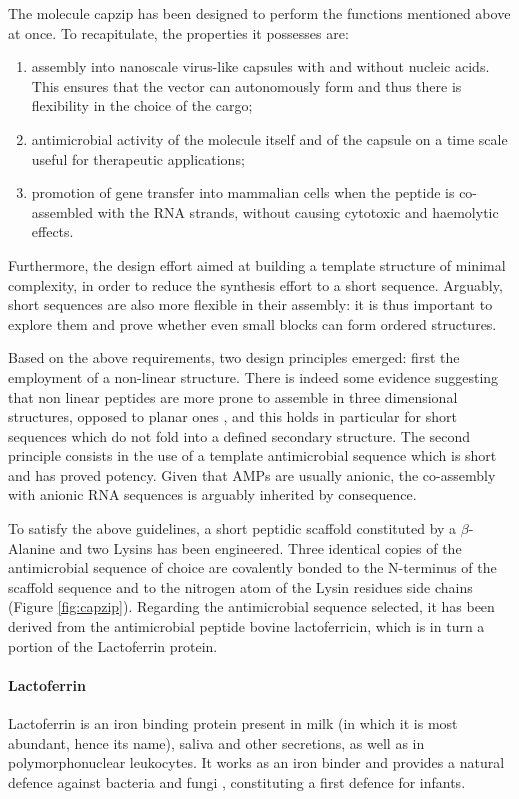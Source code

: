 The molecule capzip has been designed to perform the functions mentioned above at once. To recapitulate, the properties it possesses are:
\begin{enumerate}
\item assembly into nanoscale virus-like capsules with and without nucleic acids. This ensures that the vector can autonomously form and thus there is flexibility in the choice of the cargo;
\item antimicrobial activity of the molecule itself and of the capsule on a time scale useful for therapeutic applications;
\item promotion of gene transfer into mammalian cells when the peptide is co-assembled with the RNA strands, without causing cytotoxic and haemolytic effects.
\end{enumerate}
%
Furthermore, the design effort aimed at building a template structure of minimal complexity, in order to reduce the synthesis effort to a short sequence. Arguably, short sequences are also more flexible in their assembly: it is thus important to explore them and prove whether even small blocks can form ordered structures.

Based on the above requirements, two design principles emerged: first the employment of a non-linear structure. There is indeed some evidence suggesting that non linear peptides are more prone to assemble in three dimensional structures, opposed to planar ones \citep{???}, and this holds in particular for short sequences which do not fold into a defined secondary structure.
%
The second principle consists in the use of a template antimicrobial sequence which is short and has proved potency.
%
Given that AMPs are usually anionic, the co-assembly with anionic RNA sequences is arguably inherited by consequence.

To satisfy the above guidelines, a short peptidic scaffold constituted by a $\beta$-Alanine and two Lysins has been engineered.
%
Three identical copies of the antimicrobial sequence of choice are covalently bonded to the N-terminus of the scaffold sequence and to the nitrogen atom of the Lysin residues side chains (Figure \ref{fig:capzip}).
%
Regarding the antimicrobial sequence selected, it has been derived from the antimicrobial peptide bovine lactoferricin, which is in turn a portion of the Lactoferrin protein.

\paragraph{Lactoferrin} Lactoferrin is an iron binding protein present in milk (in which it is most abundant, hence its name), saliva and other secretions, as well as in polymorphonuclear leukocytes.
%
It works as an iron binder and provides a natural defence against bacteria and fungi \citep{Sanchez1992,Arnold1977,Arnold1980,Kirkpatrick1971,Jahani2015}, constituting a first defence for infants.

